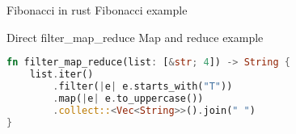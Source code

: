 
\begin{frame}{Fibonacci in rust}
    Fibonacci example


\end{frame}

\begin{frame}[fragile]{Direct filter\_map\_reduce}
    Map and reduce example

    \begin{lstlisting}[language=Rust,escapechar=@,label={lst:map_reduce-test}]
fn filter_map_reduce(list: [&str; 4]) -> String {
    list.iter()
        .filter(|e| e.starts_with("T"))
        .map(|e| e.to_uppercase())
        .collect::<Vec<String>>().join(" ")
}\end{lstlisting}

\end{frame}
